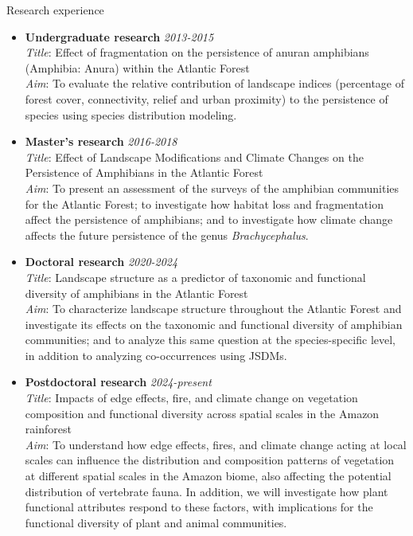 \documentclass{resume}
\begin{document}
\begin{rSection}{Research experience}
\begin{itemize}
\item \textbf{Undergraduate research} \hfill{\em 2013-2015}\\
\textit{Title}: Effect of fragmentation on the persistence of anuran amphibians (Amphibia: Anura) within the Atlantic Forest\\
\textit{Aim}: To evaluate the relative contribution of landscape indices (percentage of forest cover, connectivity, relief and urban proximity) to the persistence of species using species distribution modeling.

\item \textbf{Master's research} \hfill{\em 2016-2018}\\
\textit{Title}: Effect of Landscape Modifications and Climate Changes on the Persistence of Amphibians in the Atlantic Forest\\
\textit{Aim}: To present an assessment of the surveys of the amphibian communities for the Atlantic Forest; to investigate how habitat loss and fragmentation affect the persistence of amphibians; and to investigate how climate change affects the future persistence of the genus \textit{Brachycephalus}.

\item \textbf{Doctoral research} \hfill{\em 2020-2024}\\
\textit{Title}: Landscape structure as a predictor of taxonomic and functional diversity of amphibians in the Atlantic Forest\\
\textit{Aim}: To characterize landscape structure throughout the Atlantic Forest and investigate its effects on the taxonomic and functional diversity of amphibian communities; and to analyze this same question at the species-specific level, in addition to analyzing co-occurrences using JSDMs.

\item \textbf{Postdoctoral research} \hfill{\em 2024-present}\\
\textit{Title}: Impacts of edge effects, fire, and climate change on vegetation composition and functional diversity across spatial scales in the Amazon rainforest\\
\textit{Aim}: To understand how edge effects, fires, and climate change acting at local scales can influence the distribution and composition patterns of vegetation at different spatial scales in the Amazon biome, also affecting the potential distribution of vertebrate fauna. In addition, we will investigate how plant functional attributes respond to these factors, with implications for the functional diversity of plant and animal communities.


\end{itemize}
\end{rSection}
\end{document}
